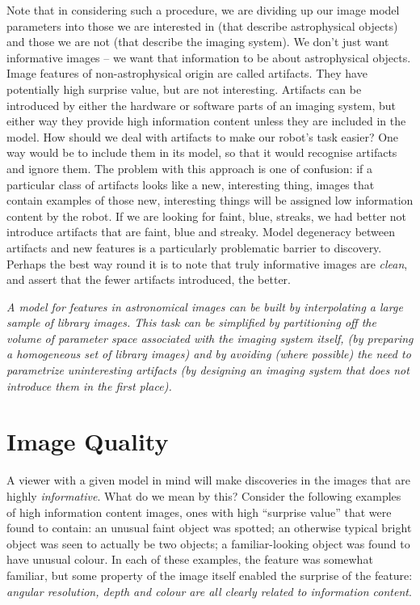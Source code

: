 \documentclass[letterpaper, 11pt]{article}
\begin{document}
Note that in considering such a procedure, we are dividing up our image  model
parameters into those we are interested in (that describe astrophysical
objects) and those we are not (that describe the imaging system). We don't
just want informative images -- we want that information to be about 
astrophysical objects. Image features of non-astrophysical origin are called
artifacts. They  have potentially high surprise value, but are not
interesting. Artifacts can be introduced by either the hardware or software
parts of an imaging system, but either way they provide high information
content unless they are included in the model.  How should we deal with
artifacts to make our robot's task easier? One way would be to include them in
its model, so that it would recognise artifacts and ignore them. The problem
with this approach is one of confusion: if a particular class of artifacts
looks like a new, interesting thing, images that contain examples of those
new, interesting things will be assigned low information content by the robot.
If we are looking for faint, blue, streaks, we had better not
introduce artifacts that are faint, blue and streaky.
Model degeneracy between artifacts and new features is a particularly 
problematic barrier to discovery. Perhaps the best way round it is to  note
that truly informative images are {\it clean}, and assert that the 
fewer artifacts introduced, the better.

{\it A model for features in astronomical images can be built by interpolating
a large sample of library images. This task can be simplified by partitioning
off the volume of parameter space associated with the imaging system itself,
(by preparing a homogeneous set of library images) and by avoiding (where
possible) the need to parametrize uninteresting artifacts (by designing an
imaging system that does not introduce them in the first place).}



\section{Image Quality}

A viewer with a given model in mind will make discoveries in the images  that
are highly {\it informative}. What do we mean by this? Consider the following
examples of high information content images, ones with high ``surprise value''
that were found to contain:  an unusual faint object was spotted;  an
otherwise typical bright object was seen to actually be two objects; a
familiar-looking object was found to have unusual colour.  In each of these
examples, the feature was somewhat familiar, but some property of the image
itself enabled the surprise of the feature: {\it angular resolution, depth and
colour are all clearly related to information content}. 
\end{document}
